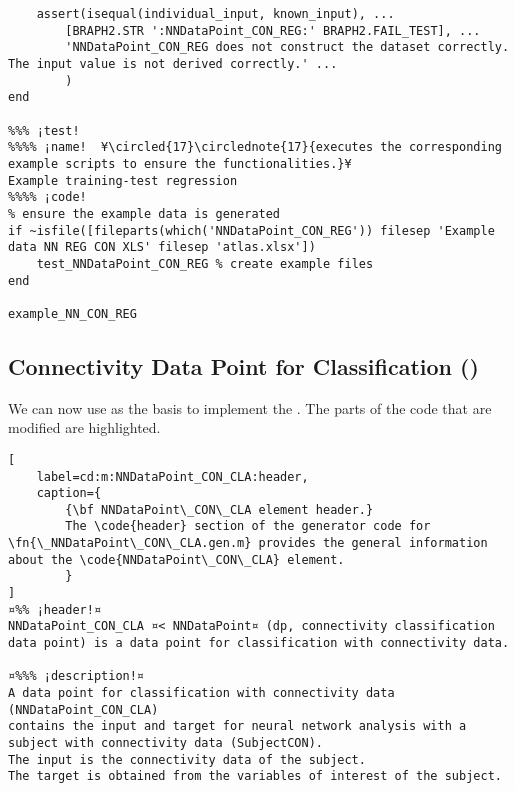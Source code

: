 \documentclass{tufte-handout}
\begin{document}
\begin{lstlisting}
    assert(isequal(individual_input, known_input), ...
        [BRAPH2.STR ':NNDataPoint_CON_REG:' BRAPH2.FAIL_TEST], ...
        'NNDataPoint_CON_REG does not construct the dataset correctly. The input value is not derived correctly.' ...
        )
end

%%% ¡test! 
%%%% ¡name!  ¥\circled{17}\circlednote{17}{executes the corresponding example scripts to ensure the functionalities.}¥
Example training-test regression
%%%% ¡code!
% ensure the example data is generated
if ~isfile([fileparts(which('NNDataPoint_CON_REG')) filesep 'Example data NN REG CON XLS' filesep 'atlas.xlsx'])
    test_NNDataPoint_CON_REG % create example files
end

example_NN_CON_REG

\end{lstlisting}

\clearpage
\subsection{Connectivity Data Point for Classification ()}

We can now use  as the basis to implement the .
The parts of the code that are modified are highlighted. 

\begin{lstlisting}[
	label=cd:m:NNDataPoint_CON_CLA:header,
	caption={
		{\bf NNDataPoint\_CON\_CLA element header.}
		The \code{header} section of the generator code for \fn{\_NNDataPoint\_CON\_CLA.gen.m} provides the general information about the \code{NNDataPoint\_CON\_CLA} element.
		}
]
¤%% ¡header!¤
NNDataPoint_CON_CLA ¤< NNDataPoint¤ (dp, connectivity classification data point) is a data point for classification with connectivity data.

¤%%% ¡description!¤
A data point for classification with connectivity data (NNDataPoint_CON_CLA) 
contains the input and target for neural network analysis with a subject with connectivity data (SubjectCON).
The input is the connectivity data of the subject.
The target is obtained from the variables of interest of the subject.
\end{lstlisting}
\end{document}

